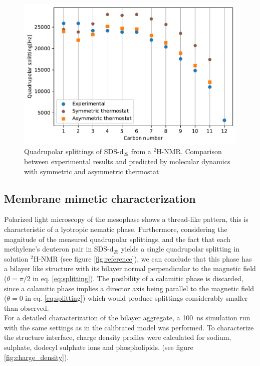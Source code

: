 \documentclass[3p,preprint,review]{elsarticle}
\begin{document}
	\begin{figure}[h]
		\centering
		\includegraphics[width=\columnwidth]{calibration2}
		\caption{Quadrupolar splittings of SDS-d$_{25}$ from a $^2$H-NMR. Comparison
			between experimental results and predicted by molecular dynamics with
			symmetric and asymmetric thermostat}
		\label{fig:2nd_calibration}
	\end{figure}
	
	\subsection{Membrane mimetic characterization}
	\label{sec:characterization}
	
	Polarized light microscopy of the mesophase shows a thread-like pattern, this
	is
	characteristic of a lyotropic nematic phase\cite{dierking2006textures}.
	Furthermore, considering the magnitude of the measured quadrupolar
	splittings, and the fact that each methylene's deuteron pair in SDS-d$_{25}$
	yields
	a
	single quadrupolar splitting in solution $^2$H-NMR (see figure
	\ref{fig:reference}), we can conclude that this phase has a bilayer
	like structure with its bilayer normal perpendicular
	to the magnetic field ($\theta=\pi/2$ in eq. \ref{eq:splitting}). The
	posibility of a calamitic phase is discarded, since a calamitic phase implies a
	director axis being parallel to the magnetic field ($\theta=0$ in eq.
	\ref{eq:splitting}) which would produce splittings considerably smaller than
	observed.\\
	
	For a detailed characterization of the bilayer aggregate, a \SI{100}{ns}
	simulation run with the same settings as in the calibrated model was performed.
	To characterize the structure
	interface, charge density profiles were calculated for sodium, sulphate,
	dodecyl sulphate ions and phospholipids. (see figure \ref{fig:charge_density}).
	
\end{document}
